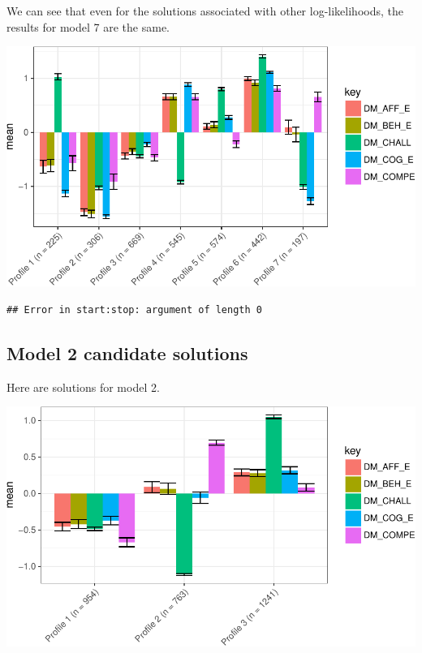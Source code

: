 \documentclass[]{book}
\theoremstyle{definition}
\theoremstyle{definition}
\theoremstyle{definition}
\theoremstyle{remark}
\begin{document}
We can see that even for the solutions associated with other
log-likelihoods, the results for model 7 are the same.

\begin{center}\includegraphics[width=0.8\linewidth]{rosenberg-dissertation_files/figure-latex/spec-solutions-m1_7-other-LL-1} \end{center}

\begin{verbatim}
## Error in start:stop: argument of length 0
\end{verbatim}

\subsection{Model 2 candidate
solutions}\label{model-2-candidate-solutions}

Here are solutions for model 2.

\begin{center}\includegraphics[width=0.8\linewidth]{rosenberg-dissertation_files/figure-latex/spec-solutions-for-model2-1} \end{center}
\end{document}
